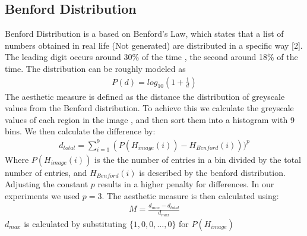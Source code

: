 \documentclass{acmart}
\begin{document}
\subsection*{Benford Distribution}
Benford Distribution is a based on Benford's Law, which states that a list of numbers obtained in real life (Not generated) are distributed in a specific way [2]. The leading digit occurs around 30\% of the time
, the second around 18\% of the time. The distribution can be roughly modeled as 
\begin{align*}
    P(d) = log_{10}(1 + \frac{1}{d})
\end{align*}
The aesthetic measure is defined as the distance the distribution of greyscale values from the Benford distribution. To achieve this we calculate the greyscale values of each region in the image
, and then sort them into a histogram with 9 bins. We then calculate the difference by:
\begin{align*}
    d_{total} = \sum_{i=1}^9 (P(H_{image} (i)) - H_{Benford}(i)))^p
\end{align*}
Where $P(H_{image} (i))$ is the the number of entries in a bin divided by the total number of entries, and $H_{Benford}(i)$ is described by the benford distribution. Adjusting the constant $p$
results in a higher penalty for differences. In our experiments we used $p = 3$.
The aesthetic measure is then calculated using:
\begin{align*}
    M = \frac{d_{max} - d_{total}}{d_{max}}
\end{align*}
$d_{max}$ is calculated by substituting $\{1,0,0,...,0\}$ for $P(H_{image})$
\end{document}
